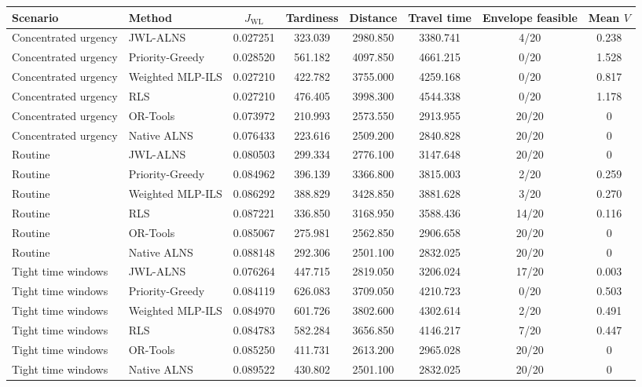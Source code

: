 \documentclass[11pt,a4paper]{article}
\begin{document}
\begin{center}
\scriptsize
\setlength{\tabcolsep}{4pt}
\begin{tabular}{llcccccc}
\toprule
Scenario & Method & $J_{\mathrm{WL}}$ & Tardiness & Distance & Travel time & Envelope feasible & Mean $V$ \\
\midrule
Concentrated urgency & JWL-ALNS & 0.027251 & 323.039 & 2980.850 & 3380.741 & 4/20 & 0.238 \\
Concentrated urgency & Priority-Greedy & 0.028520 & 561.182 & 4097.850 & 4661.215 & 0/20 & 1.528 \\
Concentrated urgency & Weighted MLP-ILS & 0.027210 & 422.782 & 3755.000 & 4259.168 & 0/20 & 0.817 \\
Concentrated urgency & RLS & 0.027210 & 476.405 & 3998.300 & 4544.338 & 0/20 & 1.178 \\
Concentrated urgency & OR-Tools & 0.073972 & 210.993 & 2573.550 & 2913.955 & 20/20 & 0 \\
Concentrated urgency & Native ALNS & 0.076433 & 223.616 & 2509.200 & 2840.828 & 20/20 & 0 \\
Routine & JWL-ALNS & 0.080503 & 299.334 & 2776.100 & 3147.648 & 20/20 & 0 \\
Routine & Priority-Greedy & 0.084962 & 396.139 & 3366.800 & 3815.003 & 2/20 & 0.259 \\
Routine & Weighted MLP-ILS & 0.086292 & 388.829 & 3428.850 & 3881.628 & 3/20 & 0.270 \\
Routine & RLS & 0.087221 & 336.850 & 3168.950 & 3588.436 & 14/20 & 0.116 \\
Routine & OR-Tools & 0.085067 & 275.981 & 2562.850 & 2906.658 & 20/20 & 0 \\
Routine & Native ALNS & 0.088148 & 292.306 & 2501.100 & 2832.025 & 20/20 & 0 \\
Tight time windows & JWL-ALNS & 0.076264 & 447.715 & 2819.050 & 3206.024 & 17/20 & 0.003 \\
Tight time windows & Priority-Greedy & 0.084119 & 626.083 & 3709.050 & 4210.723 & 0/20 & 0.503 \\
Tight time windows & Weighted MLP-ILS & 0.084970 & 601.726 & 3802.600 & 4302.614 & 2/20 & 0.491 \\
Tight time windows & RLS & 0.084783 & 582.284 & 3656.850 & 4146.217 & 7/20 & 0.447 \\
Tight time windows & OR-Tools & 0.085250 & 411.731 & 2613.200 & 2965.028 & 20/20 & 0 \\
Tight time windows & Native ALNS & 0.089522 & 430.802 & 2501.100 & 2832.025 & 20/20 & 0 \\
\bottomrule
\end{tabular}
\end{center}
\end{document}
